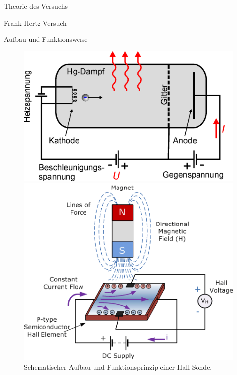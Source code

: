 \documentclass[pdftex, a4paper,11pt, twoside, ngerman]{report}
\begin{document}
\begin{chapter}{Theorie des Versuchs}
\begin{section}{Frank-Hertz-Versuch}
\begin{subsection}{Aufbau und Funktionsweise}
\begin{figure}[ht]
          \centering
          \begin{minipage}{0.48\textwidth}
            \centering
            \includegraphics[width=\textwidth]{Figures/hertz.png}
            \caption{Schematischer Aufbau des Franck-Hertz-Versuches.}
            \label{fig:FHaufbau}
          \end{minipage}\quad
          \begin{minipage}{0.48\textwidth}
            \centering
            \includegraphics[width=\textwidth]{Figures/hall-sensor.png}
                \caption{Schematischer Aufbau und Funktionsprinzip einer
                    Hall-Sonde.}
            \label{fig:hallsensor}
          \end{minipage}
        \end{figure}
      \end{subsection}
      

\end{section}
\end{chapter}
\end{document}
